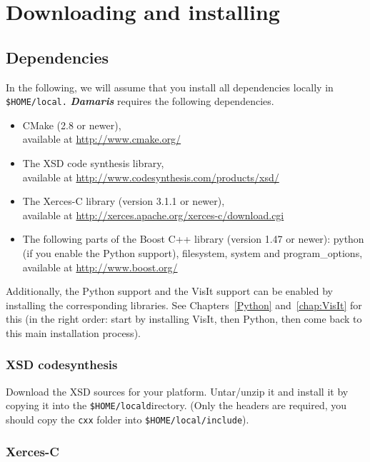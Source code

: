 \documentclass[11pt]{report}
\newcommand{\Damaris}{\emph{\textbf{Damaris}}}
\newcommand{\installdir}[1]{\texttt{\$HOME/local#1}}
\begin{document}
\chapter{Downloading and installing}\label{chap:downloadingAndInstalling}

\section{Dependencies}\label{sec:dependencies}

In the following, we will assume that you install all dependencies locally in \installdir.
\Damaris{} requires the following dependencies.
\begin{itemize}
	\item CMake (2.8 or newer), \\ available at \url{http://www.cmake.org/}
	\item The XSD code synthesis library, \\ available at \url{http://www.codesynthesis.com/products/xsd/}
	\item The Xerces-C library (version 3.1.1 or newer), \\
	available at \url{http://xerces.apache.org/xerces-c/download.cgi}
	\item The following parts of the Boost C++ library (version 1.47 or newer): python (if you enable the 
	Python support), filesystem, system and program\_options, available at \url{http://www.boost.org/}
\end{itemize}

Additionally, the Python support and the VisIt support can be enabled by installing the corresponding
libraries. See Chapters~\ref{Python} and~\ref{chap:VisIt} for this (in the right order: start by installing VisIt, then
Python, then come back to this main installation process).

\subsection{XSD codesynthesis}

Download the XSD sources for your platform.
Untar/unzip it and install it by copying it into the \installdir directory. 
(Only the headers are required, you should copy the \texttt{cxx} folder into \installdir{/include}).

\subsection{Xerces-C}
\end{document}
